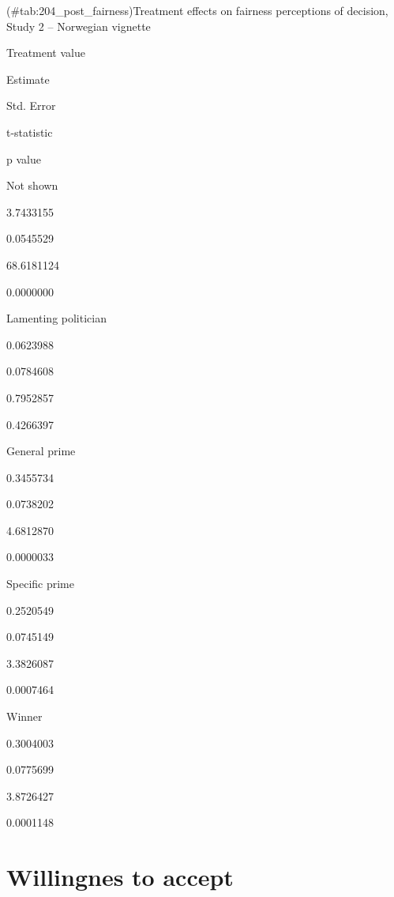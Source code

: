 \documentclass[]{book}
\begin{document}
(\#tab:204\_post\_fairness)Treatment effects on fairness perceptions of
decision, Study 2 -- Norwegian vignette

Treatment value

Estimate

Std. Error

t-statistic

p value

Not shown

3.7433155

0.0545529

68.6181124

0.0000000

Lamenting politician

0.0623988

0.0784608

0.7952857

0.4266397

General prime

0.3455734

0.0738202

4.6812870

0.0000033

Specific prime

0.2520549

0.0745149

3.3826087

0.0007464

Winner

0.3004003

0.0775699

3.8726427

0.0001148

\section{Willingnes to accept}\label{willingnes-to-accept}
\end{document}
